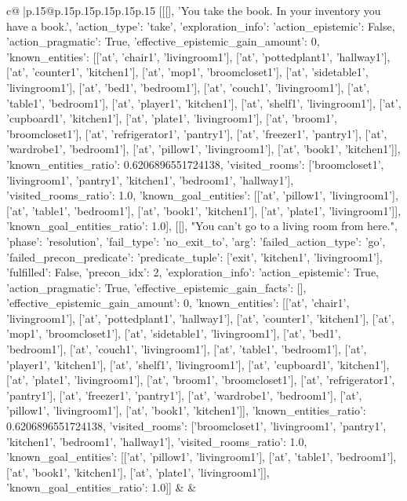\documentclass{article}
\begin{document}
{\begin{supertabular}{c@{$\;$}|p{.15\linewidth}@{}p{.15\linewidth}p{.15\linewidth}p{.15\linewidth}p{.15\linewidth}p{.15\linewidth}}
{{{	 [[[], 'You take the book. In your inventory you have a book.', {'action_type': 'take', 'exploration_info': {'action_epistemic': False, 'action_pragmatic': True, 'effective_epistemic_gain_amount': 0, 'known_entities': [['at', 'chair1', 'livingroom1'], ['at', 'pottedplant1', 'hallway1'], ['at', 'counter1', 'kitchen1'], ['at', 'mop1', 'broomcloset1'], ['at', 'sidetable1', 'livingroom1'], ['at', 'bed1', 'bedroom1'], ['at', 'couch1', 'livingroom1'], ['at', 'table1', 'bedroom1'], ['at', 'player1', 'kitchen1'], ['at', 'shelf1', 'livingroom1'], ['at', 'cupboard1', 'kitchen1'], ['at', 'plate1', 'livingroom1'], ['at', 'broom1', 'broomcloset1'], ['at', 'refrigerator1', 'pantry1'], ['at', 'freezer1', 'pantry1'], ['at', 'wardrobe1', 'bedroom1'], ['at', 'pillow1', 'livingroom1'], ['at', 'book1', 'kitchen1']], 'known_entities_ratio': 0.6206896551724138, 'visited_rooms': ['broomcloset1', 'livingroom1', 'pantry1', 'kitchen1', 'bedroom1', 'hallway1'], 'visited_rooms_ratio': 1.0, 'known_goal_entities': [['at', 'pillow1', 'livingroom1'], ['at', 'table1', 'bedroom1'], ['at', 'book1', 'kitchen1'], ['at', 'plate1', 'livingroom1']], 'known_goal_entities_ratio': 1.0}}], [[], "You can't go to a living room from here.", {'phase': 'resolution', 'fail_type': 'no_exit_to', 'arg': {'failed_action_type': 'go', 'failed_precon_predicate': {'predicate_tuple': ['exit', 'kitchen1', 'livingroom1'], 'fulfilled': False, 'precon_idx': 2}}, 'exploration_info': {'action_epistemic': True, 'action_pragmatic': True, 'effective_epistemic_gain_facts': [], 'effective_epistemic_gain_amount': 0, 'known_entities': [['at', 'chair1', 'livingroom1'], ['at', 'pottedplant1', 'hallway1'], ['at', 'counter1', 'kitchen1'], ['at', 'mop1', 'broomcloset1'], ['at', 'sidetable1', 'livingroom1'], ['at', 'bed1', 'bedroom1'], ['at', 'couch1', 'livingroom1'], ['at', 'table1', 'bedroom1'], ['at', 'player1', 'kitchen1'], ['at', 'shelf1', 'livingroom1'], ['at', 'cupboard1', 'kitchen1'], ['at', 'plate1', 'livingroom1'], ['at', 'broom1', 'broomcloset1'], ['at', 'refrigerator1', 'pantry1'], ['at', 'freezer1', 'pantry1'], ['at', 'wardrobe1', 'bedroom1'], ['at', 'pillow1', 'livingroom1'], ['at', 'book1', 'kitchen1']], 'known_entities_ratio': 0.6206896551724138, 'visited_rooms': ['broomcloset1', 'livingroom1', 'pantry1', 'kitchen1', 'bedroom1', 'hallway1'], 'visited_rooms_ratio': 1.0, 'known_goal_entities': [['at', 'pillow1', 'livingroom1'], ['at', 'table1', 'bedroom1'], ['at', 'book1', 'kitchen1'], ['at', 'plate1', 'livingroom1']], 'known_goal_entities_ratio': 1.0}}]] 
	  } 
	   } 
	   } 
	 & & \\ 
 


\end{supertabular}}
\end{document}
